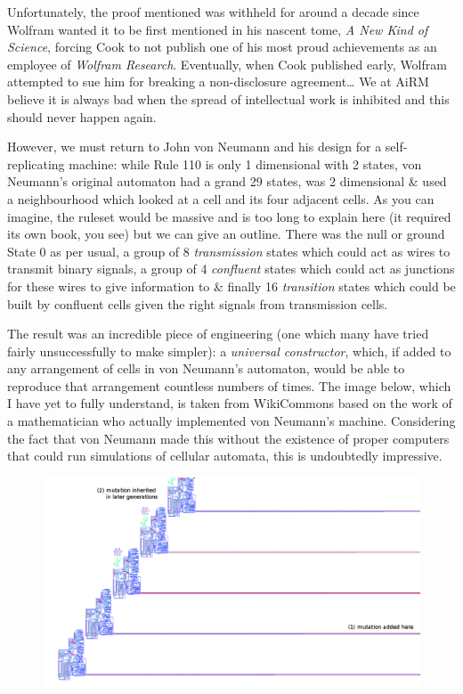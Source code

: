 Unfortunately, the proof mentioned was withheld for around a decade
since Wolfram wanted it to be first mentioned in his nascent tome,
\emph{A New Kind of Science}, forcing Cook to not publish one of his
most proud achievements as an employee of \emph{Wolfram Research}.
Eventually, when Cook published early, Wolfram attempted to sue him for
breaking a non-disclosure agreement\ldots{} We at AiRM believe it is
always bad when the spread of intellectual work is inhibited and this
should never happen again.

However, we must return to John von Neumann and his design for a
self-replicating machine: while Rule 110 is only 1 dimensional with 2
states, von Neumann's original automaton had a grand 29 states, was 2
dimensional \& used a neighbourhood which looked at a cell and its four
adjacent cells. As you can imagine, the ruleset would be massive and is
too long to explain here (it required its own book, you see) but we can
give an outline. There was the null or ground State 0 as per usual, a
group of 8 \emph{transmission} states which could act as wires to
transmit binary signals, a group of 4 \emph{confluent} states which
could act as junctions for these wires to give information to \& finally
16 \emph{transition} states which could be built by confluent cells
given the right signals from transmission cells.

The result was an incredible piece of engineering (one which many have
tried fairly unsuccessfully to make simpler): a \emph{universal
constructor}, which, if added to any arrangement of cells in von
Neumann's automaton, would be able to reproduce that arrangement
countless numbers of times. The image below, which I have yet to fully
understand, is taken from WikiCommons based on the work of a
mathematician who actually implemented von Neumann's machine.
Considering the fact that von Neumann made this without the existence of
proper computers that could run simulations of cellular automata, this
is undoubtedly impressive.

\begin{figure}[htbp]
\centering
\includegraphics{image_3.png}
\caption{}
\end{figure}

